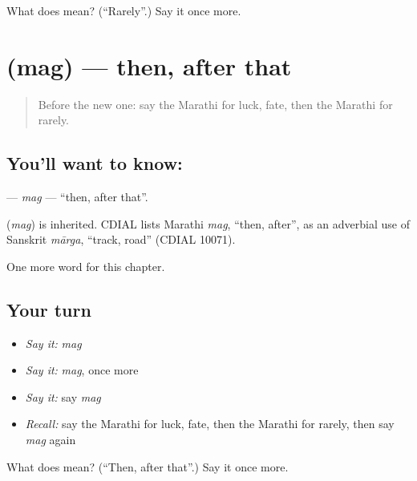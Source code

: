 \begin{tcolorbox}[breakable,colback=teal!4,colframe=teal!35!black,title={Before you move on}]
What does  mean? (\textquotedblleft{}Rarely\textquotedblright{}.) Say it once more.
\end{tcolorbox}
\section[\texorpdfstring{\mr{मग} (mag)}{मग (mag)}]{ (mag) — then, after that}

\label{lesson:MR-C171-mag}



\begin{quote}
Before the new one: say the Marathi for luck, fate, then the Marathi for rarely.
\end{quote}

\subsection*{You'll want to know: }
\textbf{} — \emph{mag} — \textquotedblleft{}then, after that\textquotedblright{}.

\begin{cousinweb}
\textbf{} (\emph{mag}) is inherited. CDIAL lists Marathi \emph{mag}, \textquotedblleft{}then, after\textquotedblright{}, as an adverbial use of Sanskrit \emph{mārga}, \textquotedblleft{}track, road\textquotedblright{} (CDIAL 10071).
\end{cousinweb}

\begin{grammarlens}[title={What you've built}]
One more word for this chapter.
\end{grammarlens}

\subsection*{Your turn}
\begin{itemize}
\raggedright
  \item \emph{Say it:} \emph{mag}
  \item \emph{Say it:} \emph{mag}, once more
  \item \emph{Say it:} say \emph{mag}
  \item \emph{Recall:} say the Marathi for luck, fate, then the Marathi for rarely, then say \emph{mag} again
\end{itemize}

\begin{tcolorbox}[breakable,colback=teal!4,colframe=teal!35!black,title={Before you move on}]
What does  mean? (\textquotedblleft{}Then, after that\textquotedblright{}.) Say it once more.
\end{tcolorbox}
